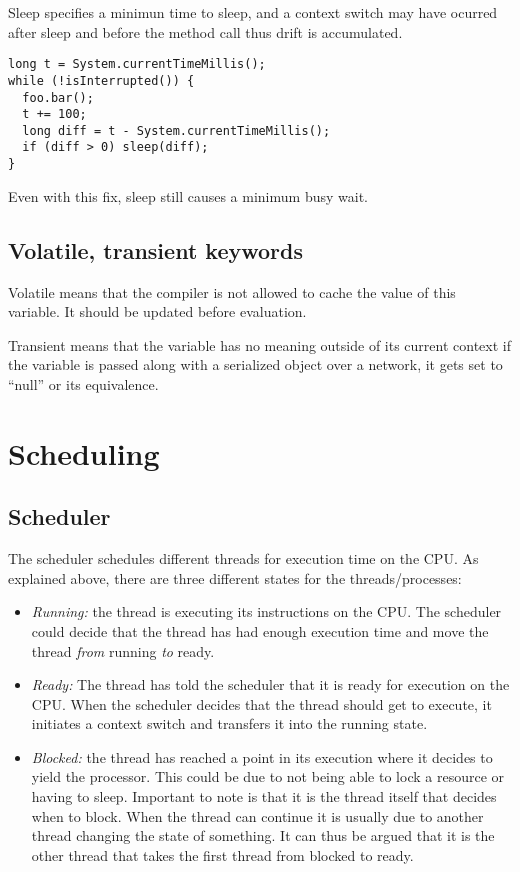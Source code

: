 \documentclass[a4paper]{article}
\begin{document}
Sleep specifies a minimun time to sleep, and a context switch may have ocurred
after sleep and before the method call thus drift is accumulated.

\begin{lstlisting}[label=drift-fix,caption=Drift fixed]
long t = System.currentTimeMillis();
while (!isInterrupted()) {
  foo.bar();
  t += 100;
  long diff = t - System.currentTimeMillis();
  if (diff > 0) sleep(diff);
}
\end{lstlisting}

Even with this fix, sleep still causes a minimum busy wait.

\subsection{Volatile, transient keywords}
Volatile means that the compiler is not allowed to cache the value of this
variable. It should be updated before evaluation.

Transient means that the variable has no meaning outside of its current context
if the variable is passed along with a serialized object over a network, it
gets set to ``null'' or its equivalence.

\section{Scheduling}
\subsection{Scheduler}
The scheduler schedules different threads for execution time on the CPU. As
explained above, there are three different states for the threads/processes:

\begin{itemize}
  \item \emph{Running:} the thread is executing its instructions on the CPU.
        The scheduler could decide that the thread has had enough execution time
        and move the thread \emph{from} running \emph{to} ready.
  \item \emph{Ready:} The thread has told the scheduler that it is ready for
        execution on the CPU. When the scheduler decides that the thread should
        get to execute, it initiates a context switch and transfers it into
        the running state.
  \item \emph{Blocked:} the thread has reached a point in its execution where
        it decides to yield the processor. This could be due to not being able
        to lock a resource or having to sleep. Important to note is that it is
        the thread itself that decides when to block. When the thread can continue
        it is usually due to another thread changing the state of something.
        It can thus be argued that it is the other thread that takes the first
        thread from blocked to ready.
\end{itemize}
\end{document}
